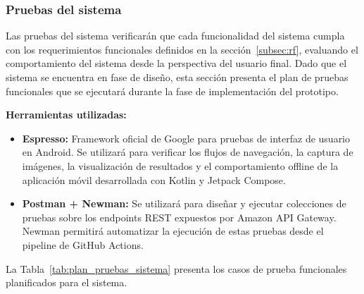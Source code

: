 \newpage
\subsubsection{Pruebas del sistema}

Las pruebas del sistema verificarán que cada funcionalidad del sistema
cumpla con los requerimientos funcionales definidos en la
sección~\ref{subsec:rf}, evaluando el comportamiento del sistema desde
la perspectiva del usuario final. Dado que el sistema se encuentra en
fase de diseño, esta sección presenta el plan de pruebas funcionales
que se ejecutará durante la fase de implementación del prototipo.

\textbf{Herramientas utilizadas:}

\begin{itemize}
    \item \textbf{Espresso:} Framework oficial de Google para pruebas
    de interfaz de usuario en Android. Se utilizará para verificar los
    flujos de navegación, la captura de imágenes, la visualización de
    resultados y el comportamiento offline de la aplicación móvil
    desarrollada con Kotlin y Jetpack Compose.
    \item \textbf{Postman + Newman:} Se utilizará para diseñar y
    ejecutar colecciones de pruebas sobre los endpoints REST expuestos
    por Amazon API Gateway. Newman permitirá automatizar la ejecución
    de estas pruebas desde el pipeline de GitHub Actions.
\end{itemize}

La Tabla~\ref{tab:plan_pruebas_sistema} presenta los casos de prueba
funcionales planificados para el sistema.

